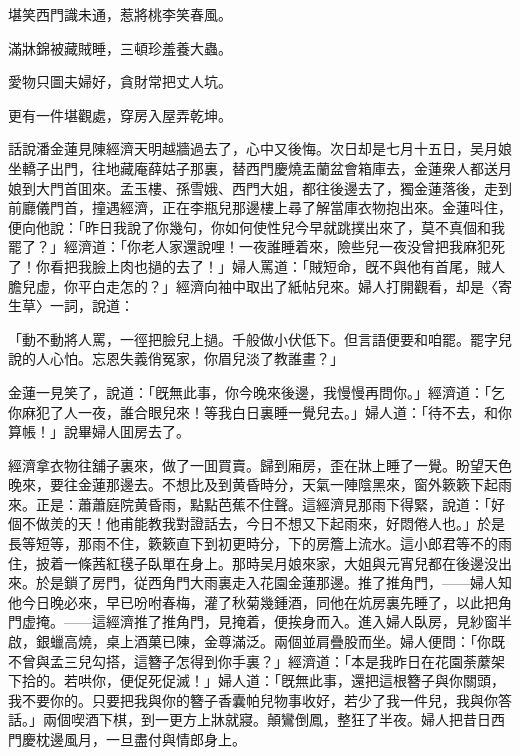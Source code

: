 堪笑西門識未通，惹將桃李笑春風。

滿牀錦被藏賊睡，三頓珍羞養大蟲。

愛物只圖夫婦好，貪財常把丈人坑。

更有一件堪觀處，穿房入屋弄乾坤。

話說潘金蓮見陳經濟天明越牆過去了，心中又後悔。次日却是七月十五日，吴月娘坐轎子出門，往地藏庵薛姑子那裏，替西門慶燒盂蘭盆會箱庫去，金蓮衆人都送月娘到大門首囬來。孟玉樓、孫雪娥、西門大姐，都往後邊去了，獨金蓮落後，走到前廳儀門首，撞遇經濟，正在李瓶兒那邊樓上尋了解當庫衣物抱出來。金蓮呌住，便向他說：「昨日我說了你幾句，你如何使性兒今早就跳撲出來了，莫不真個和我罷了？」經濟道：「你老人家還說哩！一夜誰睡着來，險些兒一夜没曾把我麻犯死了！你看把我臉上肉也撾的去了！」婦人罵道：「賊短命，旣不與他有首尾，賊人膽兒虚，你平白走怎的？」經濟向袖中取出了紙帖兒來。婦人打開觀看，却是〈寄生草〉一詞，說道：

「動不動將人罵，一徑把臉兒上撾。千般做小伏低下。但言語便要和咱罷。罷字兒說的人心怕。忘恩失義俏冤家，你眉兒淡了教誰畫？」

金蓮一見笑了，說道：「旣無此事，你今晚來後邊，我慢慢再問你。」經濟道：「乞你麻犯了人一夜，誰合眼兒來！等我白日裏睡一覺兒去。」婦人道：「待不去，和你算帳！」說畢婦人囬房去了。

經濟拿衣物往舖子裏來，做了一囬買賣。歸到廂房，歪在牀上睡了一覺。盼望天色晚來，要往金蓮那邊去。不想比及到黄昏時分，天氣一陣陰黑來，窗外簌簌下起雨來。正是：蕭蕭庭院黄昏雨，點點芭蕉不住聲。這經濟見那雨下得緊，說道：「好個不做羙的天！他甫能教我對證話去，今日不想又下起雨來，好悶倦人也。」於是長等短等，那雨不住，簌簌直下到初更時分，下的房簷上流水。這小郎君等不的雨住，披着一條茜紅氁子臥單在身上。那時吴月娘來家，大姐與元宵兒都在後邊没出來。於是鎖了房門，従西角門大雨裏走入花園金蓮那邊。推了推角門，——婦人知他今日晚必來，早已吩咐春梅，灌了秋菊幾鍾酒，同他在炕房裏先睡了，以此把角門虚掩。——這經濟推了推角門，見掩着，便挨身而入。進入婦人臥房，見紗窗半啟，銀蠟高燒，桌上酒菓已陳，金尊滿泛。兩個並肩疊股而坐。婦人便問：「你既不曾與孟三兒勾搭，這簪子怎得到你手裏？」經濟道：「本是我昨日在花園荼䕷架下拾的。若哄你，便促死促滅！」婦人道：「旣無此事，還把這根簪子與你關頭，我不要你的。只要把我與你的簪子香囊帕兒物事收好，若少了我一件兒，我與你答話。」兩個喫酒下棋，到一更方上牀就寢。顛鸞倒鳳，整狂了半夜。婦人把昔日西門慶枕邊風月，一旦盡付與情郎身上。


